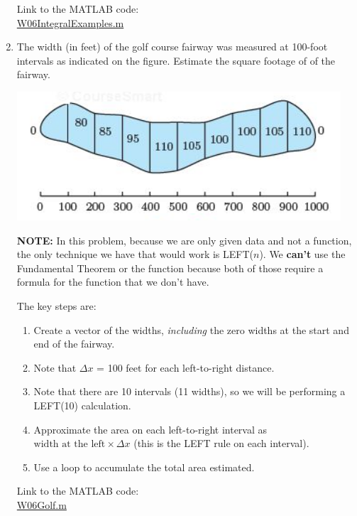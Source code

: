 \begin{enumerate}[1.]
\begin{Solution}
Link to the MATLAB code: \\
\href{http://www.mast.queensu.ca/~apsc171/MNTCP01/PracticeProblems/MATLAB/W06IntegralExamples.m}{W06IntegralExamples.m}
\end{Solution}

\item 
  \begin{Question}
    The width (in feet) of the golf course fairway was measured at
    100-foot intervals as indicated on the figure.  Estimate the square
    footage of of the fairway.  
    
    \begin{center}
      \includegraphics[width=0.5\linewidth]{graphics/Week06_IntegrationApplications/GolfHole}
    \end{center}
  \end{Question}
  
  
\begin{Solution}
  {\bf NOTE: } In this problem, because we are only given data and not
  a function, the only technique we have that would work is LEFT($n$).
  We {\bf can't} use the Fundamental Theorem or the \verb@integral@
  function because both of those require a formula for the function
  that we don't have.

The key steps are:
\begin{enumerate}[1.]
\item Create a vector of the widths, {\em including} the zero widths
  at the start and end of the fairway.
\item Note that  $\Delta x$ = 100 feet for each left-to-right distance.
\item Note that there are 10 intervals (11 widths), so we will be performing a LEFT(10) calculation.
\item Approximate the area on each left-to-right interval as
  $\mbox{width at the left} \times \Delta x$ (this is the LEFT rule on
  each interval).
\item Use a loop to accumulate the total area estimated.
\end{enumerate}

Link to the MATLAB code: \\
\href{http://www.mast.queensu.ca/~apsc171/MNTCP01/PracticeProblems/MATLAB/W06Golf.m}{W06Golf.m}


\end{Solution}
\end{enumerate}
